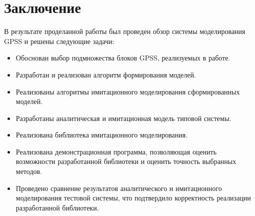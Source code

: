 \chapter{Заключение}

В результате проделанной работы был проведен обзор системы моделирования GPSS и решены следующие задачи:

\begin{itemize}
\item Обоснован выбор подмножества блоков GPSS, реализуемых в работе.
\item Разработан и реализован алгоритм формирования моделей.
\item Реализованы алгоритмы имитационного моделирования сформированных моделей.
\item Разработаны аналитическая и имитационная модель типовой системы.
\item Реализована библиотека имитационного моделирования.
\item Реализована демонстрационная программа, позволяющая оценить возможности разработанной библиотеки и оценить точность выбранных методов.
\item Проведено сравнение результатов аналитического и имитационного моделирования тестовой системы, что подтвердило корректность реализации разработанной библиотеки.


\end{itemize}
